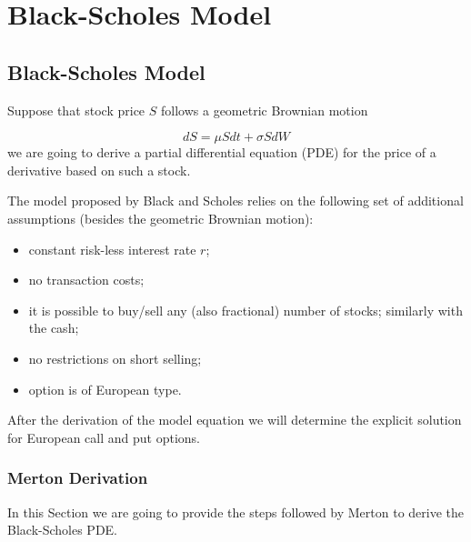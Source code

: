 \chapter{Black-Scholes Model}
\label{ch:BS}

\section{Black-Scholes Model}
Suppose that stock price $S$ follows a geometric Brownian motion

\begin{equation}
dS = \mu Sdt + \sigma SdW
\label{eq:bs_gbm}
\end{equation}
we are going to derive a partial differential equation (PDE) for the price of a derivative based on such a stock.

The model proposed by Black and Scholes relies on the following set of additional assumptions (besides the geometric Brownian motion):
\begin{itemize}
\tightlist 
\item constant risk-less interest rate $r$;
\item no transaction costs;
\item it is possible to buy/sell any (also fractional) number of stocks; similarly with the cash;
\item no restrictions on short selling;
\item option is of European type.
\end{itemize}

After the derivation of the model equation we will determine the explicit solution for European call and put options.

\subsection{Merton Derivation}
In this Section we are going to provide the steps followed by Merton to derive the Black-Scholes PDE.

